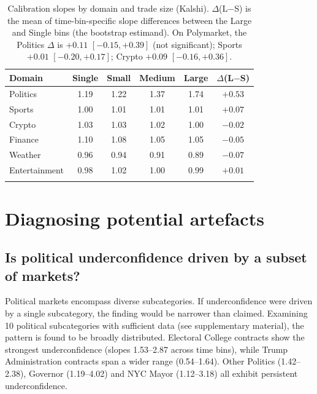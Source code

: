 \documentclass[numsec,webpdf,modern,medium]{oup-authoring-template}
\theoremstyle{thmstyleone}%
\theoremstyle{thmstyletwo}%
\theoremstyle{thmstylethree}%
\begin{document}
\begin{table}[!t]
\caption{Calibration slopes by domain and trade size (Kalshi). $\Delta$(L$-$S) is the mean of time-bin-specific slope differences between the Large and Single bins (the bootstrap estimand). On Polymarket, the Politics $\Delta$ is $+0.11$ $[-0.15, +0.39]$ (not significant); Sports $+0.01$ $[-0.20, +0.17]$; Crypto $+0.09$ $[-0.16, +0.36]$.\label{tab:scale}}%
\begin{tabular*}{\columnwidth}{@{\extracolsep\fill}lccccc@{\extracolsep\fill}}
\toprule
Domain & Single & Small & Medium & Large & $\Delta$(L$-$S) \\
\midrule
Politics      & 1.19 & 1.22 & 1.37 & 1.74 & $+0.53$ \\
Sports        & 1.00 & 1.01 & 1.01 & 1.01 & $+0.07$ \\
Crypto        & 1.03 & 1.03 & 1.02 & 1.00 & $-0.02$ \\
Finance       & 1.10 & 1.08 & 1.05 & 1.05 & $-0.05$ \\
Weather       & 0.96 & 0.94 & 0.91 & 0.89 & $-0.07$ \\
Entertainment & 0.98 & 1.02 & 1.00 & 0.99 & $+0.01$ \\
\botrule
\end{tabular*}
\end{table}
\section{Diagnosing potential artefacts}\label{sec:artefacts}

\subsection{Is political underconfidence driven by a subset of markets?}\label{sec:subset}

Political markets encompass diverse subcategories. If underconfidence were driven by a single subcategory, the finding would be narrower than claimed. Examining 10 political subcategories with sufficient data (see supplementary material), the pattern is found to be broadly distributed. Electoral College contracts show the strongest underconfidence (slopes 1.53--2.87 across time bins), while Trump Administration contracts span a wider range (0.54--1.64). Other Politics (1.42--2.38), Governor (1.19--4.02) and NYC Mayor (1.12--3.18) all exhibit persistent underconfidence.
\end{document}
